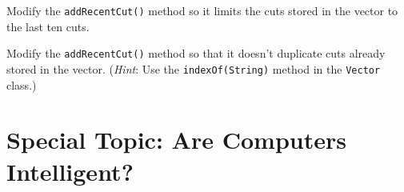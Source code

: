 \begin{SSTUDY}

\item  Modify the {\tt addRecentCut()} method so it limits the cuts stored
in the vector to the last ten cuts.


\item  Modify the {\tt addRecentCut()} method so that it doesn't duplicate
cuts already stored in the vector. ({\it Hint}: Use the 
{\tt indexOf(String)} method in the {\tt Vector} class.)

\end{SSTUDY}

\section*{{\color{cyan}Special Topic:} Are Computers Intelligent?}

